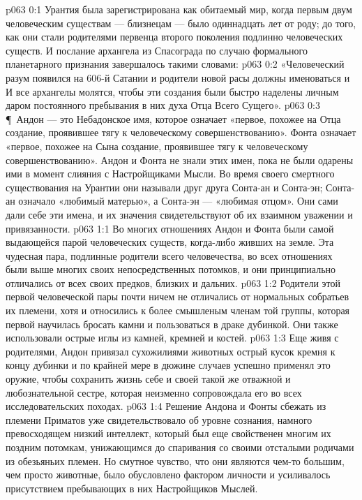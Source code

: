 \author{Носитель Жизни}
\vs p063 0:1 Урантия была зарегистрирована как обитаемый мир, когда первым двум человеческим существам --- близнецам --- было одиннадцать лет от роду; до того, как они стали родителями первенца второго поколения подлинно человеческих существ. И послание архангела из Спасограда по случаю формального планетарного признания завершалось такими словами:
\vs p063 0:2 «Человеческий разум появился на 606\hyp{}й Сатании и родители новой расы должны именоваться  и  И все архангелы молятся, чтобы эти создания были быстро наделены личным даром постоянного пребывания в них духа Отца Всего Сущего».
\vs p063 0:3 \P\ Андон --- это Небадонское имя, которое означает «первое, похожее на Отца создание, проявившее тягу к человеческому совершенствованию». Фонта означает «первое, похожее на Сына создание, проявившее тягу к человеческому совершенствованию». Андон и Фонта не знали этих имен, пока не были одарены ими в момент слияния с Настройщиками Мысли. Во время своего смертного существования на Урантии они называли друг друга Сонта\hyp{}ан и Сонта\hyp{}эн; Сонта\hyp{}ан означало «любимый матерью», а Сонта\hyp{}эн --- «любимая отцом». Они сами дали себе эти имена, и их значения свидетельствуют об их взаимном уважении и привязанности.
\vs p063 1:1 Во многих отношениях Андон и Фонта были самой выдающейся парой человеческих существ, когда\hyp{}либо живших на земле. Эта чудесная пара, подлинные родители всего человечества, во всех отношениях были выше многих своих непосредственных потомков, и они принципиально отличались от всех своих предков, близких и дальних.
\vs p063 1:2 Родители этой первой человеческой пары почти ничем не отличались от нормальных собратьев их племени, хотя и относились к более смышленым членам той группы, которая первой научилась бросать камни и пользоваться в драке дубинкой. Они также использовали острые иглы из камней, кремней и костей.
\vs p063 1:3 Еще живя с родителями, Андон привязал сухожилиями животных острый кусок кремня к концу дубинки и по крайней мере в дюжине случаев успешно применял это оружие, чтобы сохранить жизнь себе и своей такой же отважной и любознательной сестре, которая неизменно сопровождала его во всех исследовательских походах.
\vs p063 1:4 Решение Андона и Фонты сбежать из племени Приматов уже свидетельствовало об уровне сознания, намного превосходящем низкий интеллект, который был еще свойственен многим их поздним потомкам, унижающимся до спаривания со своими отсталыми родичами из обезьяньих племен. Но смутное чувство, что они являются чем\hyp{}то большим, чем просто животные, было обусловлено фактором личности и усиливалось присутствием пребывающих в них Настройщиков Мыслей.
